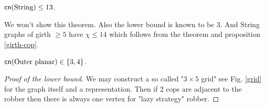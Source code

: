 \begin{thm}
	$\operatorname{\textsf{cn}}(\text{String}) \leq 13$.
\end{thm}

We won't show this theorem. Also the lower bound is known to be 3. And String graphs of girth $\geq 5$ have $\chi \leq 14$ which follows from the theorem and proposition \ref{girth-cop}.

\begin{thm}
	$\operatorname{\textsf{cn}}(\text{Outer planar}) \in \{3,4\}$.
\end{thm}

\begin{proof}[Proof of the lower bound]
	We may construct a so called "$3 \times 5$ grid" see Fig. \ref{grid} for the graph itself and a representation. Then if 2 cops are adjacent to the robber then there is always one vertex for "lazy strategy" robber.
	

\end{proof}
